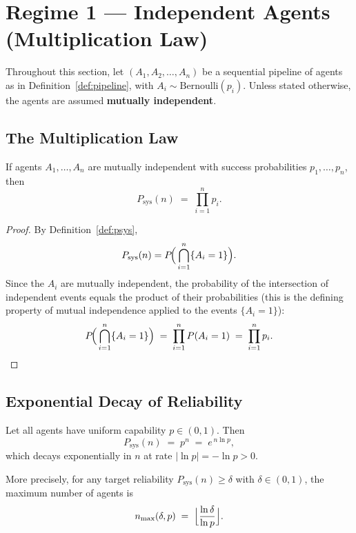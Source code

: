 \section{Regime 1 --- Independent Agents (Multiplication Law)}
\label{sec:regime1}

Throughout this section, let $(A_1, A_2, \ldots, A_n)$ be a sequential pipeline of
agents as in Definition~\ref{def:pipeline}, with $A_i \sim \mathrm{Bernoulli}(p_i)$.
Unless stated otherwise, the agents are assumed \textbf{mutually independent}.

\subsection{The Multiplication Law}

\begin{theorem}
\label{thm:mult-law}
If agents $A_1, \ldots, A_n$ are mutually independent with success probabilities
$p_1, \ldots, p_n$, then
\[
  P_{\mathrm{sys}}(n) \;=\; \prod_{i=1}^{n} p_i.
\]
\end{theorem}

\begin{proof}
By Definition~\ref{def:psys},
\[
  P_{\mathrm{sys}}(n) = P\!\Bigl(\,\bigcap_{i=1}^{n} \{A_i = 1\}\Bigr).
\]
Since the $A_i$ are mutually independent, the probability of the intersection of
independent events equals the product of their probabilities (this is the defining
property of mutual independence applied to the events $\{A_i = 1\}$):
\[
  P\!\Bigl(\,\bigcap_{i=1}^{n} \{A_i = 1\}\Bigr)
  \;=\; \prod_{i=1}^{n} P(A_i = 1)
  \;=\; \prod_{i=1}^{n} p_i.
  \qedhere
\]
\end{proof}

\subsection{Exponential Decay of Reliability}

\begin{theorem}
\label{thm:exp-decay}
Let all agents have uniform capability $p \in (0,1)$. Then
\[
  P_{\mathrm{sys}}(n) \;=\; p^n \;=\; e^{\,n \ln p},
\]
which decays exponentially in $n$ at rate $|\ln p| = -\ln p > 0$.

More precisely, for any target reliability $P_{\mathrm{sys}}(n) \geq \delta$ with
$\delta \in (0,1)$, the maximum number of agents is
\[
  n_{\max}(\delta, p) \;=\; \Bigl\lfloor \frac{\ln \delta}{\ln p} \Bigr\rfloor.
\]
\end{theorem}

